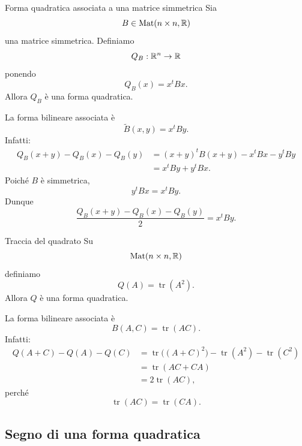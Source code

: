 \documentclass[a4paper]{article}
\begin{document}
\begin{snippetexample}{Forma quadratica associata a una matrice simmetrica}
    Sia
    \[
        B\in\operatorname{Mat}(n\times n,\mathbb{R})
    \]
    una matrice simmetrica. Definiamo
    \[
        Q_B:\mathbb{R}^n\to\mathbb{R}
    \]
    ponendo
    \[
        Q_B(x)=x^tBx.
    \]
    Allora \(Q_B\) è una forma quadratica.

    La forma bilineare associata è
    \[
        \widetilde{B}(x,y)=x^tBy.
    \]
    Infatti:
    \begin{align*}
        Q_B(x+y)-Q_B(x)-Q_B(y)
        &=
        (x+y)^tB(x+y)-x^tBx-y^tBy\\
        &=
        x^tBy+y^tBx.
    \end{align*}
    Poiché \(B\) è simmetrica,
    \[
        y^tBx=x^tBy.
    \]
    Dunque
    \[
        \frac{Q_B(x+y)-Q_B(x)-Q_B(y)}{2}
        =
        x^tBy.
    \]
\end{snippetexample}

\begin{snippetexample}{Traccia del quadrato}
    Su
    \[
        \operatorname{Mat}(n\times n,\mathbb{R})
    \]
    definiamo
    \[
        Q(A)=\operatorname{tr}(A^2).
    \]
    Allora \(Q\) è una forma quadratica.

    La forma bilineare associata è
    \[
        B(A,C)=\operatorname{tr}(AC).
    \]
    Infatti:
    \begin{align*}
        Q(A+C)-Q(A)-Q(C)
        &=
        \operatorname{tr}\bigl((A+C)^2\bigr)
        -\operatorname{tr}(A^2)
        -\operatorname{tr}(C^2)\\
        &=
        \operatorname{tr}(AC+CA)\\
        &=
        2\operatorname{tr}(AC),
    \end{align*}
    perché
    \[
        \operatorname{tr}(AC)=\operatorname{tr}(CA).
    \]
\end{snippetexample}

\subsection{Segno di una forma quadratica}
\end{document}
